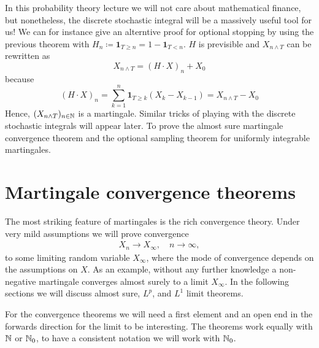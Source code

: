 In this probability theory lecture we will not care about mathematical finance, but nonetheless, the discrete stochastic integral will be a massively useful tool for us! We can for instance give an alterntive proof for optional stopping by using the previous theorem with $H_n \coloneqq \mathbf 1_{T\geq n} = 1 - \mathbf 1_{T<n}$. $H$ is previsible and $X_{n\wedge T}$ can be rewritten as
$$ X_{n\wedge T} = (H\cdot X)_n + X_0$$ because $$ (H\cdot X)_n = \sum\limits_{k=1}^{n}\mathbf 1_{T\geq k}(X_k - X_{k-1}) = X_{n\wedge T} - X_0 $$
Hence, $(X_{n\wedge T})_{n\in\mathbb{N}}$ is a martingale. Similar tricks of playing with the discrete stochastic integrals will appear later. To prove the almost sure martingale convergence theorem and the optional sampling theorem for uniformly integrable martingales.

\section{Martingale convergence theorems}
The most striking feature of martingales is the rich convergence theory. Under very mild assumptions we will prove convergence
\begin{align*}
	X_n\to X_\infty,\quad n\to\infty,
\end{align*}
to some limiting random variable $X_\infty$, where the mode of convergence depends on the assumptions on $X$. As an example, without any further knowledge a non-negative martingale converges almost surely to a limit $X_\infty$. In the following sections we will discuss almost sure, $L^p$, and $L^1$ limit theorems.\smallskip

For the convergence theorems we will need a first element and an open end in the forwards direction for the limit to be interesting. The theorems work equally with $\mathbb{N}$ or $\mathbb{N}_0$, to have a consistent notation we will work with $\mathbb{N}_0$.



